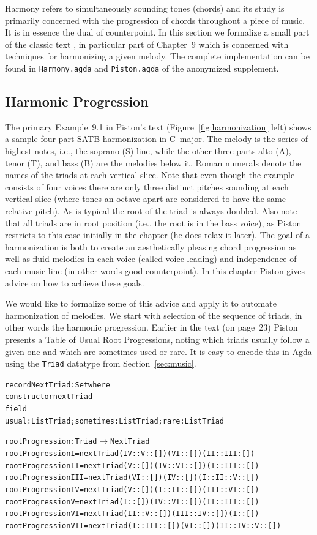 Harmony refers to simultaneously sounding tones (chords) and its study
is primarily concerned with the progression of chords throughout a
piece of music. It is in essence the dual of counterpoint. In this
section we formalize a small part of the classic text
\citet{piston-harmony}, in particular part of Chapter~9 which is
concerned with techniques for harmonizing a given melody.
The complete implementation can be found in \texttt{Harmony.agda}
and \texttt{Piston.agda} of the anonymized supplement.

\subsection{Harmonic Progression}
\label{sec:harmony:prog}

The primary Example~9.1 in Piston's text
(Figure~\ref{fig:harmonization} left) shows a
sample four part SATB harmonization in C~major. The melody is the
series of highest notes, i.e., the soprano (S) line, while the other three
parts alto (A), tenor (T), and bass (B) are the melodies below
it. Roman numerals denote the names of the triads at each vertical
slice. Note that even though the example consists of four voices there are only
three distinct pitches sounding at each vertical slice (where tones an
octave apart are considered to have the same relative pitch). As is
typical the root of the triad is always doubled. Also note that all
triads are in root position (i.e., the root is in the bass voice),
as Piston restricts to this case initially in the chapter (he does
relax it later). The goal of a harmonization is both to create an
aesthetically pleasing chord progression as well as fluid melodies in
each voice (called voice leading) and independence of each music
line (in other words good counterpoint). In this chapter
Piston gives advice on how to achieve these goals.

\Harmonization

We would like to formalize some of this advice and apply it to
automate harmonization of melodies. We start with selection of the
sequence of triads, in other words the harmonic progression. Earlier
in the text (on page~23) Piston presents a Table of Usual Root
Progressions, noting which triads usually follow a given one and
which are sometimes used or rare. It is easy to encode this in Agda
using the \texttt{Triad} datatype from Section~\ref{sec:music}.

\begin{alltt}
record NextTriad : Set where
  constructor nextTriad
  field
    usual : List Triad; sometimes : List Triad; rare : List Triad

rootProgression : Triad \(\rightarrow\) NextTriad
rootProgression I   = nextTriad (IV :: V :: []) (VI :: []) (II  :: III : [])
rootProgression II  = nextTriad (V :: []) (IV :: VI :: []) (I :: III :: [])
rootProgression III = nextTriad (VI :: []) (IV :: []) (I :: II :: V :: [])
rootProgression IV  = nextTriad (V :: []) (I :: II :: []) (III :: VI :: [])
rootProgression V   = nextTriad (I :: []) (IV :: VI :: []) (II :: III :: [])
rootProgression VI  = nextTriad (II :: V :: []) (III :: IV :: []) (I :: [])
rootProgression VII = nextTriad (I  :: III :: []) (VI :: []) (II :: IV  :: V :: [])
\end{alltt}

